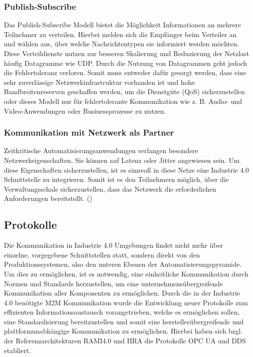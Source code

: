 \subsubsection{Publish-Subscribe}
\label{Grundlagen:Publish-Subscribe}
Das Publish-Subscribe Modell bietet die Möglichkeit Informationen an mehrere Teilnehmer zu verteilen. Hierbei melden sich die Empfänger beim Verteiler an und wählen aus, über welche Nachrichtentypen sie informiert werden möchten. Diese Verteildienste nutzen zur besseren Skalierung und Reduzierung der Netzlast häufig Datagramme wie \ac{UDP}. Durch die Nutzung von Datagrammen geht jedoch die Fehlertoleranz verloren. Somit muss entweder dafür gesorgt werden, dass eine sehr zuverlässige Netzwerkinfrastruktur vorhanden ist und hohe Bandbreitenreserven geschaffen werden, um die Dienstgüte (\ac{QoS}) sicherzustellen oder dieses Modell nur für fehlertolerante Kommunikation wie z. B. Audio- und Video-Anwendungen oder Businessprozesse zu nutzen. 

\subsubsection{Kommunikation mit Netzwerk als Partner}
Zeitkritische Automatisierungsanwendungen verlangen besondere Netzwerkeigenschaften. Sie können auf Latenz oder Jitter angewiesen sein. Um diese Eigenschaften sicherzustellen, ist es sinnvoll in diese Netze eine Industrie 4.0 Schnittstelle zu integrieren. Somit ist es den Teilnehmern möglich, über die Verwaltungsschale sicherzustellen, dass das Netzwerk die erforderlichen Anforderungen bereitstellt. (\cite{sichKom2017})

\subsection{Protokolle}
Die Kommunikation in Industrie 4.0 Umgebungen findet nicht mehr über einzelne, vorgegebene Schnittstellen statt, sondern direkt von den Produktionssystemen, also den unteren Ebenen der Automatisierungspyramide. Um dies zu ermöglichen, ist es notwendig, eine einheitliche Kommunikation durch Normen und Standards herzustellen, um eine unternehmensübergreifende Kommunikation aller Komponenten zu ermöglichen. Durch die in der Industrie 4.0 benötigte \ac{M2M} Kommunikation wurde die Entwicklung neuer Protokolle zum effizienten Informationsaustausch vorangetrieben, welche es ermöglichen sollen, eine Standardisierung bereitzustellen und somit eine herstellerübergreifende und plattformunabhängige Kommunikation zu ermöglichen. Hierbei haben sich bzgl. der Referenzarchitekturen \ac{RAMI4.0} und \ac{IIRA} die Protokolle \ac{OPC UA} und \ac{DDS} etabliert.


